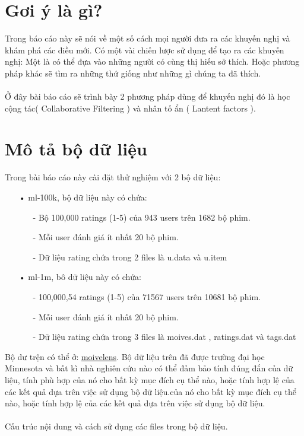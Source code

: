 \documentclass[a4paper,11pt]{report}
\begin{document}
\section{Gơi ý là gì?}
Trong báo cáo này sẽ nói về một số cách mọi người đưa ra các khuyến nghị và khám phá các điều mới. Có một vài chiến lược sử dụng để tạo ra các khuyến nghị: Một là có thể đựa vào những người có cùng thị hiếu sở thích. Hoặc phương pháp khác sẽ tìm ra những thứ giống như những gì chúng ta đã thích.\\ \\
Ở đây bài báo cáo sẽ trình bày 2 phương pháp dùng để khuyến nghị đó là học cộng tác( Collaborative Filtering ) và nhân tố ẩn ( Lantent factors ).
\newpage
\section{Mô tả bộ dữ liệu}
Trong bài báo cáo này cài đặt thử nghiệm với 2 bộ dữ liệu:
\begin{itemize}
\item[•] ml-100k, bộ dữ liệu này có chứa:
\begin{itemize}
\item[-] Bộ 100,000 ratings (1-5) của 943 users trên 1682 bộ phim.
\item[-] Mỗi user đánh giá ít nhất 20 bộ phim.
\item[-] Dữ liệu rating chứa trong 2 files là u.data và u.item
\end{itemize}
\item[•] ml-1m, bô dữ liệu này có chứa:
\begin{itemize}
\item[-] 100,000,54 ratings (1-5) của 71567 users trên 10681 bộ phim.
\item[-] Mỗi user đánh giá ít nhất 20 bộ phim.
\item[-] Dữ liệu rating chứa trong 3 files là moives.dat , ratings.dat và tags.dat
\end{itemize}
\end{itemize}
Bộ dư trện có thể ở: \href{https://grouplens.org/datasets/movielens/}{moivelens}. Bộ dữ liệu trên đã được trường đại học Minnesota và bất kì nhà nghiên cứu nào có thể đảm bảo tính đúng đắn của dữ liệu, tính phù hợp của nó cho bất kỳ mục đích cụ thể nào, hoặc tính hợp lệ của các kết quả dựa trên việc sử dụng bộ dữ liệu.của nó cho bất kỳ mục đích cụ thể nào, hoặc tính hợp lệ của các kết quả dựa trên việc sử dụng bộ dữ liệu.\\ \\
Cấu trúc nội dung và cách sử dụng các files trong bộ dữ liệu.
\end{document}
